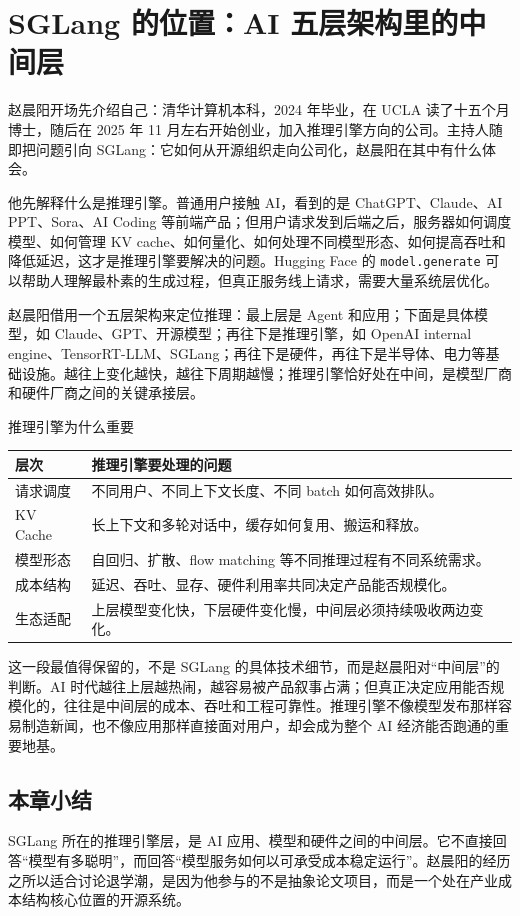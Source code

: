\section{SGLang 的位置：AI 五层架构里的中间层}

赵晨阳开场先介绍自己：清华计算机本科，2024 年毕业，在 UCLA 读了十五个月博士，随后在 2025 年 11 月左右开始创业，加入推理引擎方向的公司。主持人随即把问题引向 SGLang：它如何从开源组织走向公司化，赵晨阳在其中有什么体会。

他先解释什么是推理引擎。普通用户接触 AI，看到的是 ChatGPT、Claude、AI PPT、Sora、AI Coding 等前端产品；但用户请求发到后端之后，服务器如何调度模型、如何管理 KV cache、如何量化、如何处理不同模型形态、如何提高吞吐和降低延迟，这才是推理引擎要解决的问题。Hugging Face 的 \texttt{model.generate} 可以帮助人理解最朴素的生成过程，但真正服务线上请求，需要大量系统层优化。

赵晨阳借用一个五层架构来定位推理：最上层是 Agent 和应用；下面是具体模型，如 Claude、GPT、开源模型；再往下是推理引擎，如 OpenAI internal engine、TensorRT-LLM、SGLang；再往下是硬件，再往下是半导体、电力等基础设施。越往上变化越快，越往下周期越慢；推理引擎恰好处在中间，是模型厂商和硬件厂商之间的关键承接层。

\begin{knowledgebox}{推理引擎为什么重要}
\begin{tabularx}{\textwidth}{>{\raggedright\arraybackslash}p{} Y}
\toprule
层次 & 推理引擎要处理的问题 \\
\midrule
请求调度 & 不同用户、不同上下文长度、不同 batch 如何高效排队。 \\
KV Cache & 长上下文和多轮对话中，缓存如何复用、搬运和释放。 \\
模型形态 & 自回归、扩散、flow matching 等不同推理过程有不同系统需求。 \\
成本结构 & 延迟、吞吐、显存、硬件利用率共同决定产品能否规模化。 \\
生态适配 & 上层模型变化快，下层硬件变化慢，中间层必须持续吸收两边变化。 \\
\bottomrule
\end{tabularx}
\end{knowledgebox}

这一段最值得保留的，不是 SGLang 的具体技术细节，而是赵晨阳对“中间层”的判断。AI 时代越往上层越热闹，越容易被产品叙事占满；但真正决定应用能否规模化的，往往是中间层的成本、吞吐和工程可靠性。推理引擎不像模型发布那样容易制造新闻，也不像应用那样直接面对用户，却会成为整个 AI 经济能否跑通的重要地基。

\subsection{本章小结}

SGLang 所在的推理引擎层，是 AI 应用、模型和硬件之间的中间层。它不直接回答“模型有多聪明”，而回答“模型服务如何以可承受成本稳定运行”。赵晨阳的经历之所以适合讨论退学潮，是因为他参与的不是抽象论文项目，而是一个处在产业成本结构核心位置的开源系统。

